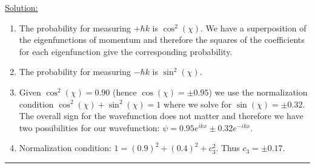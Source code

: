 \noindent
\underline{Solution:}\\
\begin{enumerate}
\item The probability for measuring $+\hbar k$ is $\cos^2(\chi)$. We have a superposition of the eigenfunctions of momentum and therefore the squares of the coefficients for each eigenfunction give the corresponding probability.
\item The probability for measuring $-\hbar k$ is $\sin^2(\chi)$.
\item Given $\cos^2(\chi) = 0.90$ (hence $\cos(\chi) = \pm 0.95$) we use the normalization condition $\cos^2(\chi) + \sin^2(\chi) = 1$
where we solve for $\sin(\chi) = \pm 0.32$. The overall sign for the wavefunction does not matter and therefore we have two possibilities
for our wavefunction: $\psi = 0.95e^{ikx} \pm 0.32e^{-ikx}$.
\item Normalization condition: $1 = (0.9)^2 + (0.4)^2 + c_3^2$. Thus $c_3 = \pm 0.17$.
\end{enumerate}

\hrule\vspace{0.5cm}

